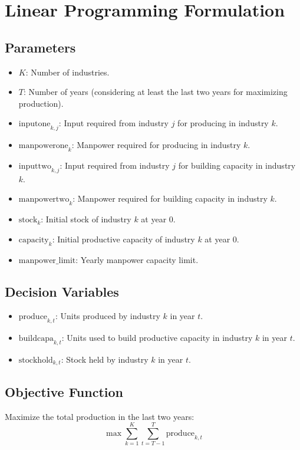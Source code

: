 \documentclass{article}
\begin{document}
\section*{Linear Programming Formulation}

\subsection*{Parameters}
\begin{itemize}
    \item $K$: Number of industries.
    \item $T$: Number of years (considering at least the last two years for maximizing production).
    \item $\text{inputone}_{k, j}$: Input required from industry $j$ for producing in industry $k$.
    \item $\text{manpowerone}_{k}$: Manpower required for producing in industry $k$.
    \item $\text{inputtwo}_{k, j}$: Input required from industry $j$ for building capacity in industry $k$.
    \item $\text{manpowertwo}_{k}$: Manpower required for building capacity in industry $k$.
    \item $\text{stock}_k$: Initial stock of industry $k$ at year 0.
    \item $\text{capacity}_k$: Initial productive capacity of industry $k$ at year 0.
    \item $\text{manpower\_limit}$: Yearly manpower capacity limit.
\end{itemize}

\subsection*{Decision Variables}
\begin{itemize}
    \item $\text{produce}_{k, t}$: Units produced by industry $k$ in year $t$.
    \item $\text{buildcapa}_{k, t}$: Units used to build productive capacity in industry $k$ in year $t$.
    \item $\text{stockhold}_{k, t}$: Stock held by industry $k$ in year $t$.
\end{itemize}

\subsection*{Objective Function}
Maximize the total production in the last two years:
\[
\max \sum_{k=1}^{K} \sum_{t=T-1}^{T} \text{produce}_{k, t}
\]
\end{document}
